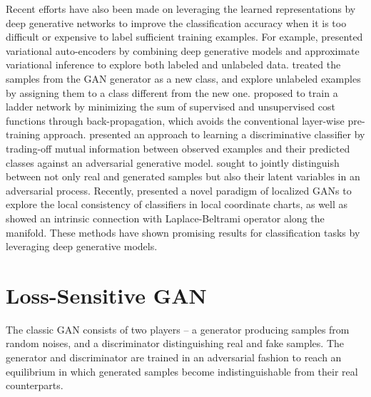 Recent efforts have also been made on leveraging the learned representations by deep generative networks to improve the classification accuracy when it is too difficult or expensive to label sufficient training examples.  For example, \cite{kingma2014semi} presented variational auto-encoders \cite{kingma2013auto} by combining deep generative models and approximate variational inference to explore both labeled and unlabeled data.
\cite{salimans2016improved} treated the samples from the GAN generator as a new class, and explore unlabeled examples by assigning them to a class different from the new one. \cite{rasmus2015semi} proposed to train a ladder network \cite{valpola2015neural} by minimizing the sum of supervised and unsupervised cost functions through back-propagation, which avoids the conventional layer-wise pre-training approach. \cite{springenberg2015unsupervised} presented an approach to learning a discriminative classifier by trading-off mutual information between observed examples and their predicted classes against an adversarial generative model. \cite{dumoulin2016adversarially} sought to jointly distinguish between not only real and generated samples but also their latent variables in an adversarial process. Recently, \cite{qi2017global} presented a novel paradigm of localized GANs to explore the local consistency of classifiers in local coordinate charts, as well as showed an intrinsic connection with Laplace-Beltrami operator along the manifold. These methods have shown promising results for classification tasks by leveraging deep generative models.




\section{Loss-Sensitive GAN}\label{sec:lsgan}
The classic GAN consists of two players -- a generator producing samples from random noises,
and a discriminator distinguishing real and fake samples. The generator and discriminator are trained in an adversarial fashion to reach an equilibrium in which generated samples become indistinguishable from their real counterparts.

